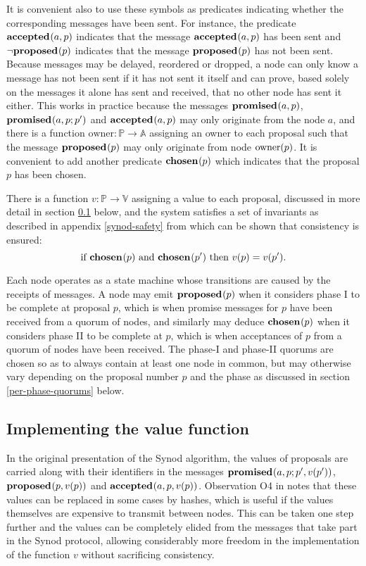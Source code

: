 \documentclass[journal]{IEEEtran}
\begin{document}
It is convenient also to use these symbols as predicates indicating whether the
corresponding messages have been sent. For instance, the predicate
$\mathbf{accepted}_{}(a,p)$ indicates that the message $\mathbf{accepted}_{}(a,p)$ has been sent and
$\neg \mathbf{proposed}_{}(p)$ indicates that the message $\mathbf{proposed}_{}(p)$ has not been sent.
Because messages may be delayed, reordered or dropped, a node can only know a
message has not been sent if it has not sent it itself and can prove, based
solely on the messages it alone has sent and received, that no other node has
sent it either. This works in practice because the messages $\mathbf{promised}_{}(a,p)$,
$\mathbf{promised}_{}(a,p;p')$ and $\mathbf{accepted}_{}(a,p)$ may only originate from the node $a$,
and there is a function $\mathrm{owner} : \mathbb P \to \mathbb A$ assigning an
owner to each proposal such that the message $\mathbf{proposed}_{}(p)$ may only originate
from node $\mathrm{owner}(p)$.  It is convenient to add another predicate
$\mathbf{chosen}_{}(p)$ which indicates that the proposal $p$ has been chosen.

There is a function $v : \mathbb P \to \mathbb V$ assigning a value to each
proposal, discussed in more detail in section \ref{value-function} below, and
the system satisfies a set of invariants as described in appendix
\ref{synod-safety} from which can be shown that consistency is ensured:
\[\textrm{if } \mathbf{chosen}_{}(p) \textrm{ and } \mathbf{chosen}_{}(p') \textrm { then } v(p)
= v(p').\]

Each node operates as a state machine whose transitions are caused by the
receipts of messages. A node may emit $\mathbf{proposed}_{}(p)$ when it considers phase I to
be complete at proposal $p$, which is when promise messages for $p$ have been
received from a quorum of nodes, and similarly may deduce $\mathbf{chosen}_{}(p)$ when
it considers phase II to be complete at $p$, which is when acceptances of $p$
from a quorum of nodes have been received. The phase-I and phase-II quorums are
chosen so as to always contain at least one node in common, but may otherwise
vary depending on the proposal number $p$ and the phase as discussed in section
\ref{per-phase-quorums} below.

\subsection{Implementing the value function}\label{value-function}

In the original presentation of the Synod algorithm, the values of proposals
are carried along with their identifiers in the messages $\mathbf{promised}_{}(a,p;
p',v(p') )$, $\mathbf{proposed}_{}( p,v(p))$ and $\mathbf{accepted}_{}(a, p,v(p) )$. Observation O4 in
\cite{cheap-paxos} notes that these values can be replaced in some cases by
hashes, which is useful if the values themselves are expensive to transmit
between nodes. This can be taken one step further and the values can be
completely elided from the messages that take part in the Synod protocol,
allowing considerably more freedom in the implementation of the function $v$
without sacrificing consistency.
\end{document}
